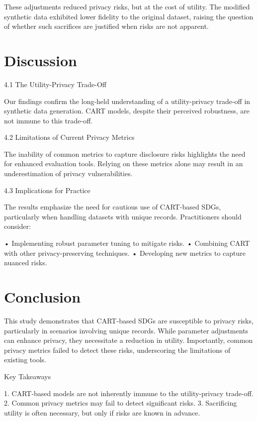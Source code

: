 \documentclass[runningheads]{llncs}
\begin{document}
These adjustments reduced privacy risks, but at the cost of utility. The modified synthetic data exhibited lower fidelity to the original dataset, raising the question of whether such sacrifices are justified when risks are not apparent.

\section{Discussion}


4.1 The Utility-Privacy Trade-Off

Our findings confirm the long-held understanding of a utility-privacy trade-off in synthetic data generation. CART models, despite their perceived robustness, are not immune to this trade-off.

4.2 Limitations of Current Privacy Metrics

The inability of common metrics to capture disclosure risks highlights the need for enhanced evaluation tools. Relying on these metrics alone may result in an underestimation of privacy vulnerabilities.

4.3 Implications for Practice

The results emphasize the need for cautious use of CART-based SDGs, particularly when handling datasets with unique records. Practitioners should consider:

    •   Implementing robust parameter tuning to mitigate risks.
    •   Combining CART with other privacy-preserving techniques.
    •   Developing new metrics to capture nuanced risks.

\section{Conclusion}

This study demonstrates that CART-based SDGs are susceptible to privacy risks, particularly in scenarios involving unique records. While parameter adjustments can enhance privacy, they necessitate a reduction in utility. Importantly, common privacy metrics failed to detect these risks, underscoring the limitations of existing tools.

Key Takeaways

    1.  CART-based models are not inherently immune to the utility-privacy trade-off.
    2.  Common privacy metrics may fail to detect significant risks.
    3.  Sacrificing utility is often necessary, but only if risks are known in advance.
\end{document}
